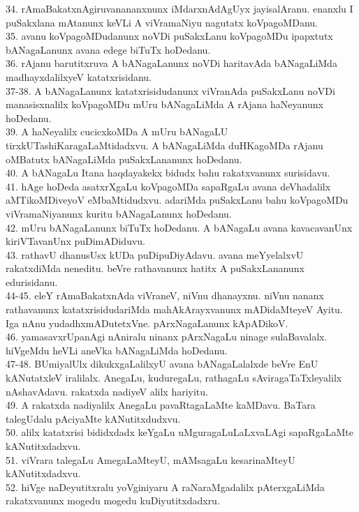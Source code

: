 \documentclass{article}
\begin{document}
34. rAmaBakatxnAgiruvanananxnunx iMdarxnAdAgUyx jayisalAranu. enanxlu I puSakxlana mAtanunx keVLi A viVramaNiyu nagutatx koVpagoMDanu.\\
35. avanu koVpagoMDudanunx noVDi puSakxLanu koVpagoMDu ipapxtutx bANagaLanunx avana edege biTuTx hoDedanu.\\
36. rAjanu barutitxruva A bANagaLanunx noVDi haritavAda bANagaLiMda madhayxdalilxyeV katatxrisidanu.\\
37-38. A bANagaLanunx katatxrisidudanunx viVranAda puSakxLanu noVDi manasisxnalilx koVpagoMDu mUru bANagaLiMda A rAjana haNeyanunx hoDedanu.\\
39. A haNeyalilx cucicxkoMDa A mUru bANagaLU tirxkUTashiKaragaLaMtidadxvu. A bANagaLiMda duHKagoMDa rAjanu oMBatutx bANagaLiMda puSakxLananunx hoDedanu.\\
40. A bANagaLu Itana haqdayakekx bidudx bahu rakatxvanunx surisidavu.\\
41. hAge hoDeda asatxrXgaLu koVpagoMDa sapaRgaLu avana deVhadalilx aMTikoMDiveyoV eMbaMtidudxvu. adariMda puSakxLanu bahu koVpagoMDu viVramaNiyanunx kuritu bANagaLanunx hoDedanu.\\
42. mUru bANagaLanunx biTuTx hoDedanu. A bANagaLu avana kavacavanUnx kiriVTavanUnx puDimADiduvu.\\
43. rathavU dhanusUsx kUDa puDipuDiyAdavu. avana meYyelalxvU rakatxdiMda neneditu. beVre rathavanunx hatitx A puSakxLananunx edurisidanu.\\
44-45. eleY rAmaBakatxnAda viVraneV, niVnu dhanayxnu. niVnu nananx rathavanunx katatxrisidudariMda mahAkArayxvanunx mADidaMteyeV Ayitu. Iga nAnu yudadhxmADutetxVne. pArxNagaLanunx kApADikoV.\\
46. yamasavxrUpanAgi nAniralu ninanx pArxNagaLu ninage sulaBavalalx. hiVgeMdu heVLi aneVka bANagaLiMda hoDedanu.\\
47-48. BUmiyalUlx dikukxgaLalilxyU avana bANagaLalalxde beVre EnU kANutatxleV iralilalx. AnegaLu, kuduregaLu, rathagaLu sAviragaTaTxleyalilx nAshavAdavu. rakatxda nadiyeV alilx hariyitu.\\
49. A rakatxda nadiyalilx AnegaLu pavaRtagaLaMte kaMDavu. BaTara talegUdalu pAciyaMte kANutitxdudxvu.\\
50. alilx katatxrisi bididxdadx keYgaLu uMguragaLuLaLxvaLAgi sapaRgaLaMte kANutitxdadxvu.\\
51. viVrara talegaLu AmegaLaMteyU, mAMsagaLu kesarinaMteyU kANutitxdadxvu.\\
52. hiVge naDeyutitxralu yoVginiyaru A raNaraMgadalilx pAterxgaLiMda rakatxvanunx mogedu mogedu kuDiyutitxdadxru.\\
\end{document}
